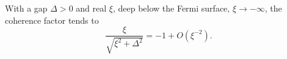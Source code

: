 \documentclass{article}
\begin{document}
With a gap $\Delta>0$ and real $\xi$, deep below the Fermi surface, $\xi\to-\infty$, the coherence factor tends to
\begin{equation}
\frac{\xi}{\sqrt{\xi^2+\Delta^2}} = -1 + O(\xi^{-2}) .
\label{eq:deep}
\end{equation}
\end{document}
